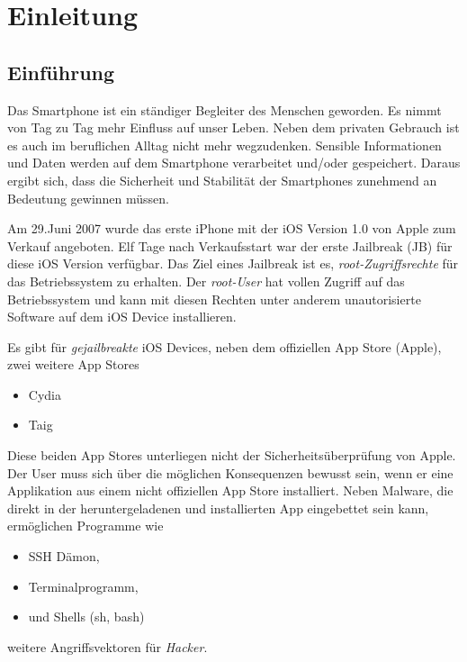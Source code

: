 %
%
%
% 


\chapter{Einleitung}
\label{ch:intro}


\section{Einführung}
\label{sec:Einführung}

Das Smartphone ist ein ständiger Begleiter des Menschen geworden. Es nimmt von Tag zu Tag mehr Einfluss auf unser Leben. Neben dem privaten Gebrauch ist es auch im beruflichen Alltag nicht mehr wegzudenken. Sensible Informationen und Daten werden auf dem Smartphone verarbeitet und/oder gespeichert. Daraus ergibt sich, dass die Sicherheit und Stabilität der Smartphones zunehmend an Bedeutung gewinnen müssen.\par 
Am 29.Juni 2007 wurde das erste iPhone mit der iOS Version 1.0 von Apple zum Verkauf angeboten. Elf Tage nach Verkaufsstart war der erste Jailbreak (JB) für diese iOS Version verfügbar. Das Ziel eines Jailbreak ist es, \textit{\glqq root-Zugriffsrechte\grqq{}} für das Betriebssystem zu erhalten. Der \textit{\glqq root-User\grqq{}} hat vollen Zugriff auf das Betriebssystem und kann mit diesen Rechten unter anderem unautorisierte Software auf dem iOS Device installieren.\par 

Es gibt für \textit{\glqq gejailbreakte\grqq{}} iOS Devices, neben dem offiziellen App Store (Apple), zwei weitere App Stores
\begin{itemize}
    \item Cydia
    \item Taig
\end{itemize}
Diese beiden App Stores unterliegen nicht der Sicherheitsüberprüfung von Apple. Der User muss sich über die möglichen Konsequenzen bewusst sein, wenn er eine Applikation aus einem nicht offiziellen App Store installiert. Neben Malware, die direkt in der heruntergeladenen und installierten App eingebettet sein kann, ermöglichen Programme wie 
\begin{itemize}
    \item SSH Dämon,
    \item Terminalprogramm,
    \item und Shells (sh, bash)
\end{itemize}
weitere Angriffsvektoren für \textit{\glqq Hacker\grqq{}}.

